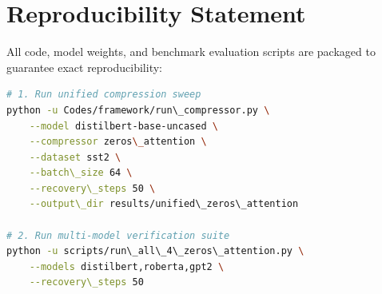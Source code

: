 \section{Reproducibility Statement}
All code, model weights, and benchmark evaluation scripts are packaged to guarantee exact reproducibility:
\begin{lstlisting}[language=bash]
# 1. Run unified compression sweep
python -u Codes/framework/run\_compressor.py \
    --model distilbert-base-uncased \
    --compressor zeros\_attention \
    --dataset sst2 \
    --batch\_size 64 \
    --recovery\_steps 50 \
    --output\_dir results/unified\_zeros\_attention

# 2. Run multi-model verification suite
python -u scripts/run\_all\_4\_zeros\_attention.py \
    --models distilbert,roberta,gpt2 \
    --recovery\_steps 50
\end{lstlisting}
